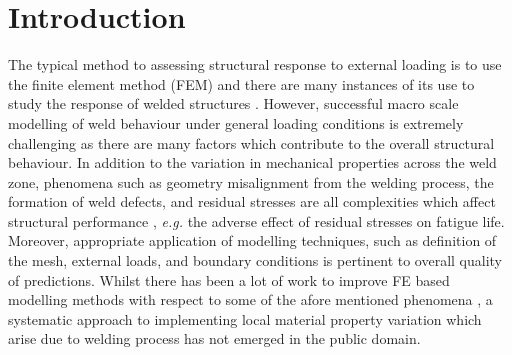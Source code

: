 \section{Introduction}
\label{Intro}
The typical method to assessing structural response to external loading is to use the finite element method (FEM) and there are many instances of its use to study the response of welded structures \cite{Grujicic2011,McWilliams2013,Reis2004,Zhao2001}. However, successful macro scale modelling of weld behaviour under general loading conditions is extremely challenging as there are many factors which contribute to the overall structural behaviour. In addition to the variation in mechanical properties across the weld zone, phenomena such as geometry misalignment from the welding process, the formation of weld defects, and residual stresses are all complexities which affect structural performance \cite{Kim2010,Grujicic2011a}, \textit{e.g.} the adverse effect of residual stresses on fatigue life. Moreover, appropriate application of modelling techniques, such as definition of the mesh, external loads, and boundary conditions is pertinent to overall quality of predictions. Whilst there has been a lot of work to improve FE based modelling methods with respect to some of the afore mentioned phenomena \cite{Zadpoor2009,McWilliams2013,Grujicic2011,Grujicic2010a}, a systematic approach to implementing local material property variation which arise due to welding process
has not emerged in the public domain. 

